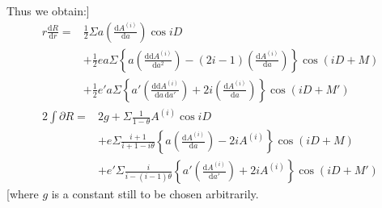 Thus we obtain:]
\[
\begin{aligned}
r\frac{\mathrm{d}R}{\mathrm{d}r}={}&\tfrac12\Sigma a\left(\frac{\mathrm{d}A^{(i)}}{\mathrm{d}a}\right)\cos iD\\
&+\tfrac12 ea\Sigma\left\{a\left(\frac{\mathrm{d}\mathrm{d}A^{(i)}}{\mathrm{d}a^2}\right)-(2i-1)\left(\frac{\mathrm{d}A^{(i)}}{\mathrm{d}a}\right)\right\}\cos(iD+M)\\
&+\tfrac12 e'a\Sigma\left\{a'\left(\frac{\mathrm{d}\mathrm{d}A^{(i)}}{\mathrm{d}a\,\mathrm{d}a'}\right)+2i\left(\frac{\mathrm{d}A^{(i)}}{\mathrm{d}a}\right)\right\}\cos(iD+M')
\end{aligned}
\]
\noindent[and because \(\mathrm{d}r=-ae\sin M\mathord{.}\,n\mathrm{d}t\), \(\mathrm{d}V=(1-2e\cos M)n\mathrm{d}t\):
\[
\begin{aligned}
\frac{\partial R}{n\mathrm{d}t}={}&-\tfrac12\Sigma iA^{(i)}\sin iD\\
&-\tfrac12 e\Sigma(i+1)\left\{a\left(\frac{\mathrm{d}A^{(i)}}{\mathrm{d}a}\right)-2iA^{(i)}\right\}\sin(iD+M)\\
&-\tfrac12 e'\Sigma i\left\{a'\left(\frac{\mathrm{d}A^{(i)}}{\mathrm{d}a'}\right)+2iA^{(i)}\right\}\sin(iD+M')
\end{aligned}
\]
\noindent and from this, if we set
\[\theta=\frac{n'}{n}\]
\noindent we obtain:]
\[
\begin{aligned}
2\int\partial R={}&2g+\Sigma\frac{1}{1-\theta}A^{(i)}\cos iD\\
&+e\Sigma\frac{i+1}{i+1-i\theta}\left\{a\left(\frac{\mathrm{d}A^{(i)}}{\mathrm{d}a}\right)-2iA^{(i)}\right\}\cos(iD+M)\\
&+e'\Sigma\frac{i}{i-(i-1)\theta}\left\{a'\left(\frac{\mathrm{d}A^{(i)}}{\mathrm{d}a'}\right)+2iA^{(i)}\right\}\cos(iD+M')
\end{aligned}
\]
\noindent[where \(g\) is a constant still to be chosen arbitrarily.

